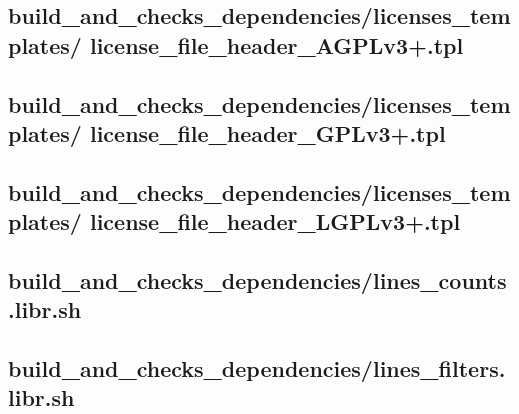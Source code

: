 \documentclass{article}
\begin{document}


\subsection{
  build\_and\_checks\_dependencies/licenses\_templates/%
license\_file\_header\_AGPLv3+.tpl
}
\label{
  build_and_checks_dependencies:licenses_templates:%
license_file_header_AGPLv3+tpl
}



\subsection{
  build\_and\_checks\_dependencies/licenses\_templates/%
license\_file\_header\_GPLv3+.tpl
}
\label{
  build_and_checks_dependencies:licenses_templates:%
license_file_header_GPLv3+tpl
}



\subsection{
  build\_and\_checks\_dependencies/licenses\_templates/%
license\_file\_header\_LGPLv3+.tpl
}
\label{
  build_and_checks_dependencies:licenses_templates:%
license_file_header_LGPLv3+tpl
}



\subsection{
  build\_and\_checks\_dependencies/lines\_counts.libr.sh
}
\label{
  build_and_checks_dependencies:lines_countslibrsh
}



\subsection{
  build\_and\_checks\_dependencies/lines\_filters.libr.sh
}
\label{
  build_and_checks_dependencies:lines_filterslibrsh
}
\end{document}
